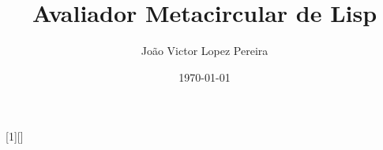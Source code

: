 
\usepackage[brazil]{babel}
\usepackage[utf8]{inputenc}
\usepackage[T1]{fontenc}
\usepackage{graphicx}
\usepackage{float}
\usepackage{geometry}
\geometry{left=0.4cm, right=0.4cm}
\usepackage{csquotes}
\usepackage{amsmath, amssymb}
\usepackage{upquote}
\usepackage{listings}
\usepackage{hyperref}

\usepackage[style=numeric, backend=biber]{biblatex}

\graphicspath{{figures/}}

[1][]{
  \lstset{
    basicstyle=\ttfamily,
    columns=flexible,
    breaklines=true,
    breakatwhitespace=true,
    frame=none,
    basewidth=0.5em,
    aboveskip=13pt,
    belowskip=0pt,
    #1
  }
}{}

\newcommand{\excerptpage}[2]{
  \begin{center}
    \textit{#1}\\
        --- #2.
  \end{center}
}

\newcommand{\var}[1]{\texttt{#1}}

\title{Avaliador Metacircular de Lisp}
\subtitle{}
\author{João Victor Lopez Pereira}
\date{\today}
